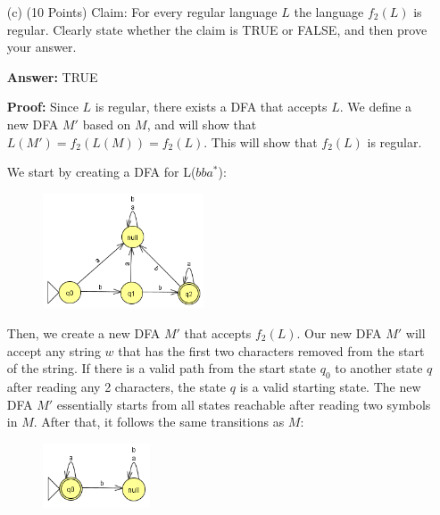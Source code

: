 \documentclass[12pt]{article}
\begin{document}
\begin{spacing}{1.5}
\begin{enumerate}
\begin{enumerate}
                              \newpage
                        \item[(c)] (10 Points) Claim: For every regular language $L$ the language $f_2(L)$ is regular. Clearly state whether the claim is TRUE or FALSE, and then prove your answer.

                              \textbf{Answer:} TRUE

                              \textbf{Proof:} Since $L$ is regular, there exists a DFA that accepts $L$. We define a new DFA $M'$ based on $M$, and will show that $L(M') = f_2(L(M))=f_2(L)$. This will show that $f_2(L)$ is regular.

                              We start by creating a DFA for L($bba^*$):
                              \begin{figure}[h!]
                                    \centering
                                    \includegraphics[width=0.45\textwidth]{img/q2/q2b(M).png}
                              \end{figure}

                              Then, we create a new DFA $M'$ that accepts $f_2(L)$. Our new DFA $M'$ will accept any string $w$ that has the first two characters removed from the start of the string. If there is a valid path from the start state $q_0$ to another state $q$ after reading any 2 characters, the state $q$ is a valid starting state. The new DFA $M'$ essentially starts from all states reachable after reading two symbols in $M$. After that, it follows the same transitions as $M$:

                              \begin{figure}[h!]
                                    \centering
                                    \includegraphics[width=0.3\textwidth]{img/q2/q2c(M').png}
                              \end{figure}
                  \end{enumerate}


\end{enumerate}
\end{spacing}
\end{document}
